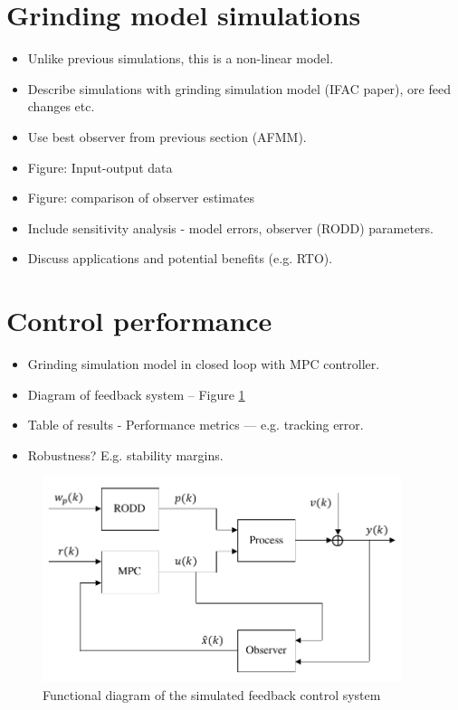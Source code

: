 \section{Grinding model simulations}

\begin{itemize}
	\item Unlike previous simulations, this is a non-linear model.
	\item Describe simulations with grinding simulation model (IFAC paper), ore feed changes etc.
	\item Use best observer from previous section (AFMM).
	\item Figure: Input-output data
	\item Figure: comparison of observer estimates
	\item Include sensitivity analysis - model errors, observer (RODD) parameters.
	\item Discuss applications and potential benefits (e.g. RTO).
\end{itemize}

\section{Control performance}

\begin{itemize}
	\item Grinding simulation model in closed loop with MPC controller.
	\item Diagram of feedback system – Figure \ref{fig:sim-mpc-diag}
	\item Table of results - Performance metrics — e.g. tracking error.
	\item Robustness?  E.g. stability margins.
\end{itemize}

\begin{figure}[htp]
	\centering
	\includegraphics[width=10.5cm]{images/sim-mpc-diag.pdf}
	\caption{Functional diagram of the simulated feedback control system}
	\label{fig:sim-mpc-diag}
\end{figure}